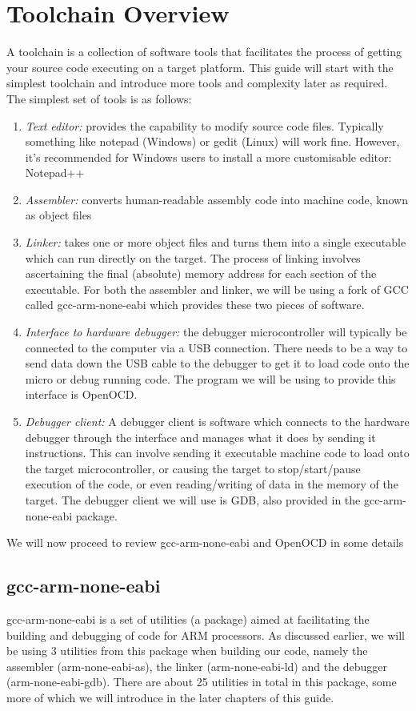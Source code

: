 \chapter{Toolchain Overview}
A toolchain is a collection of software tools that facilitates the process of getting your source code executing on a target platform. This guide will start with the simplest toolchain and introduce more tools and complexity later as required. The simplest set of tools is as follows:

\begin{enumerate}
\item \emph{Text editor:} provides the capability to modify source code files. Typically something like notepad (Windows) or gedit (Linux) will work fine. However, it's recommended for Windows users to install a more customisable editor: Notepad++
\item \emph{Assembler:} converts human-readable assembly code into machine code, known as object files
\item \emph{Linker:} takes one or more object files and turns them into a single executable which can run directly on the target. The process of linking involves ascertaining the final (absolute) memory address for each section of the executable. For both the assembler and linker, we will be using a fork of GCC called gcc-arm-none-eabi which provides these two pieces of software.
\item \emph{Interface to hardware debugger:} the debugger microcontroller will typically be connected to the computer via a USB connection. There needs to be a way to send data down the USB cable to the debugger to get it to load code onto the micro or debug running code. The program we will be using to provide this interface is OpenOCD.
\item \emph{Debugger client:} A debugger client is software which connects to the hardware debugger through the interface and manages what it does by sending it instructions. This can involve sending it executable machine code to load onto the target microcontroller, or causing the target to stop/start/pause execution of the code, or even reading/writing of data in the memory of the target. The debugger client we will use is GDB, also provided in the gcc-arm-none-eabi package.
\end{enumerate}

We will now proceed to review gcc-arm-none-eabi and OpenOCD in some details

\section{gcc-arm-none-eabi}
gcc-arm-none-eabi is a set of utilities (a package) aimed at facilitating the building and debugging of code for ARM processors. As discussed earlier, we will be using 3 utilities from this package when building our code, namely the assembler (arm-none-eabi-as), the linker (arm-none-eabi-ld) and the debugger (arm-none-eabi-gdb). There are about 25 utilities in total in this package, some more of which we will introduce in the later chapters of this guide. 

